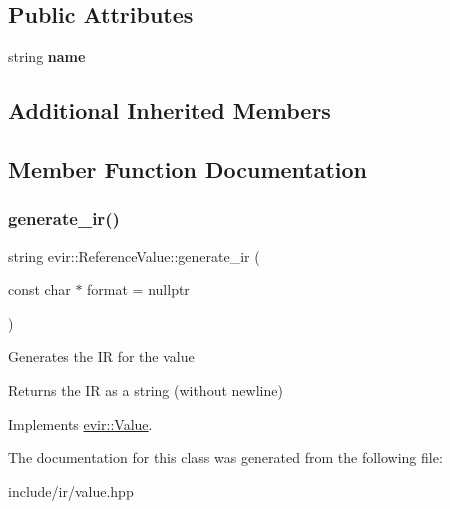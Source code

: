\subsection*{Public Attributes}
\begin{DoxyCompactItemize}
\item 
\mbox{\label{classevir_1_1ReferenceValue_ab1ee319a03944d8622ea3b06394cef1d}} 
string {\bfseries name}
\end{DoxyCompactItemize}
\subsection*{Additional Inherited Members}


\subsection{Member Function Documentation}
\mbox{\label{classevir_1_1ReferenceValue_ad669613befab66578629de2ccfb8c2c3}} 
\subsubsection{\texorpdfstring{generate\+\_\+ir()}{generate\_ir()}}
{\footnotesize\ttfamily string evir\+::\+Reference\+Value\+::generate\+\_\+ir (\begin{DoxyParamCaption}\item[{const char $\ast$}]{format = {\ttfamily nullptr} }\end{DoxyParamCaption})\hspace{0.3cm}{\ttfamily [virtual]}}

Generates the IR for the value \begin{DoxyReturn}{Returns}
the IR as a string (without newline) 
\end{DoxyReturn}


Implements \hyperlink{classevir_1_1Value_a3e7e5bc634fd5bba528324076fe2a763}{evir\+::\+Value}.



The documentation for this class was generated from the following file\+:\begin{DoxyCompactItemize}
\item 
include/ir/value.\+hpp\end{DoxyCompactItemize}
